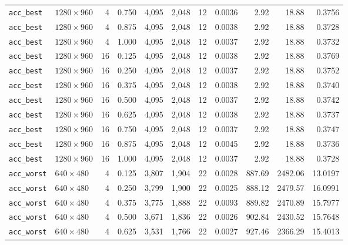 \documentclass{article}
\begin{document}
{\begin{longtable}{@{}llrrrrrrrrr@{}}
\texttt{acc\_best}    & $1280\times 960$ & 4  & 0.750 & 4{,}095   & 2{,}048   & 12 & 0.0036 & 2.92    & 18.88   & 0.3756  \\
\texttt{acc\_best}    & $1280\times 960$ & 4  & 0.875 & 4{,}095   & 2{,}048   & 12 & 0.0038 & 2.92    & 18.88   & 0.3728  \\
\texttt{acc\_best}    & $1280\times 960$ & 4  & 1.000 & 4{,}095   & 2{,}048   & 12 & 0.0037 & 2.92    & 18.88   & 0.3732  \\
\texttt{acc\_best}    & $1280\times 960$ & 16 & 0.125 & 4{,}095   & 2{,}048   & 12 & 0.0038 & 2.92    & 18.88   & 0.3769  \\
\texttt{acc\_best}    & $1280\times 960$ & 16 & 0.250 & 4{,}095   & 2{,}048   & 12 & 0.0037 & 2.92    & 18.88   & 0.3752  \\
\texttt{acc\_best}    & $1280\times 960$ & 16 & 0.375 & 4{,}095   & 2{,}048   & 12 & 0.0038 & 2.92    & 18.88   & 0.3740  \\
\texttt{acc\_best}    & $1280\times 960$ & 16 & 0.500 & 4{,}095   & 2{,}048   & 12 & 0.0037 & 2.92    & 18.88   & 0.3742  \\
\texttt{acc\_best}    & $1280\times 960$ & 16 & 0.625 & 4{,}095   & 2{,}048   & 12 & 0.0038 & 2.92    & 18.88   & 0.3737  \\
\texttt{acc\_best}    & $1280\times 960$ & 16 & 0.750 & 4{,}095   & 2{,}048   & 12 & 0.0037 & 2.92    & 18.88   & 0.3747  \\
\texttt{acc\_best}    & $1280\times 960$ & 16 & 0.875 & 4{,}095   & 2{,}048   & 12 & 0.0045 & 2.92    & 18.88   & 0.3736  \\
\texttt{acc\_best}    & $1280\times 960$ & 16 & 1.000 & 4{,}095   & 2{,}048   & 12 & 0.0037 & 2.92    & 18.88   & 0.3728  \\
\addlinespace
\texttt{acc\_worst}   & $640\times 480$  & 4  & 0.125 & 3{,}807   & 1{,}904   & 22 & 0.0028 & 887.69  & 2482.06 & 13.0197 \\
\texttt{acc\_worst}   & $640\times 480$  & 4  & 0.250 & 3{,}799   & 1{,}900   & 22 & 0.0025 & 888.12  & 2479.57 & 16.0991 \\
\texttt{acc\_worst}   & $640\times 480$  & 4  & 0.375 & 3{,}775   & 1{,}888   & 22 & 0.0093 & 889.82  & 2470.89 & 15.7977 \\
\texttt{acc\_worst}   & $640\times 480$  & 4  & 0.500 & 3{,}671   & 1{,}836   & 22 & 0.0026 & 902.84  & 2430.52 & 15.7648 \\
\texttt{acc\_worst}   & $640\times 480$  & 4  & 0.625 & 3{,}531   & 1{,}766   & 22 & 0.0027 & 927.46  & 2366.29 & 15.4013 \\

\end{longtable}}
\end{document}
